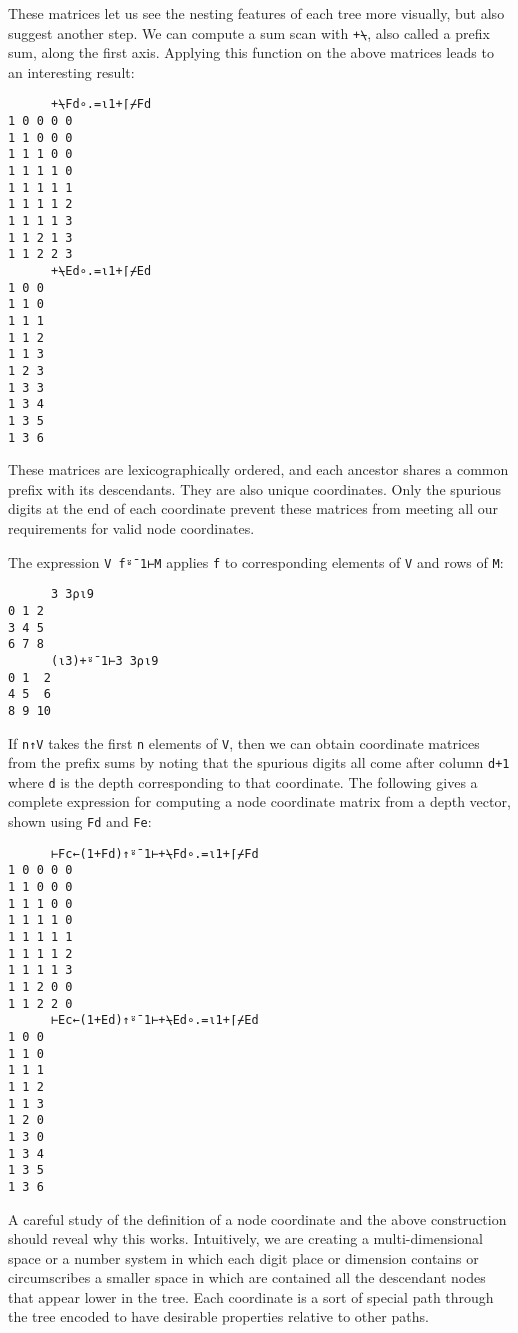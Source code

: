 \documentclass[numbers,9pt]{sigplanconf}
\begin{document}
\noindent
These matrices let us see the nesting features of each tree more
visually, but also suggest another step. We can compute a sum scan
with \verb;+⍀;, also called a prefix sum, along the first axis. Applying
this function on the above matrices leads to an interesting result:

\begin{verbatim}
      +⍀Fd∘.=⍳1+⌈⌿Fd
1 0 0 0 0
1 1 0 0 0
1 1 1 0 0
1 1 1 1 0
1 1 1 1 1
1 1 1 1 2
1 1 1 1 3
1 1 2 1 3
1 1 2 2 3
      +⍀Ed∘.=⍳1+⌈⌿Ed
1 0 0
1 1 0
1 1 1
1 1 2
1 1 3
1 2 3
1 3 3
1 3 4
1 3 5
1 3 6
\end{verbatim}

\noindent
These matrices are lexicographically ordered, and each ancestor
shares a common prefix with its descendants. They are also unique
coordinates. Only the spurious digits at the end of each coordinate
prevent these matrices from meeting all our requirements for valid
node coordinates.

The expression \verb;V f⍤¯1⊢M; applies \verb;f; to corresponding elements of
\verb;V; and rows of \verb;M;:

\begin{verbatim}
      3 3⍴⍳9
0 1 2
3 4 5
6 7 8
      (⍳3)+⍤¯1⊢3 3⍴⍳9
0 1  2
4 5  6
8 9 10
\end{verbatim}

\noindent
If \verb;n↑V; takes the first \verb;n; elements of \verb;V;, then we can obtain coordinate
matrices from the prefix sums by noting that the spurious digits
all come after column \verb;d+1; where \verb;d; is the depth corresponding to that
coordinate. The following gives a complete expression for computing
a node coordinate matrix from a depth vector, shown using \verb;Fd; and \verb;Fe;:

\begin{verbatim}
      ⊢Fc←(1+Fd)↑⍤¯1⊢+⍀Fd∘.=⍳1+⌈⌿Fd
1 0 0 0 0
1 1 0 0 0
1 1 1 0 0
1 1 1 1 0
1 1 1 1 1
1 1 1 1 2
1 1 1 1 3
1 1 2 0 0
1 1 2 2 0
      ⊢Ec←(1+Ed)↑⍤¯1⊢+⍀Ed∘.=⍳1+⌈⌿Ed
1 0 0
1 1 0
1 1 1
1 1 2
1 1 3
1 2 0
1 3 0
1 3 4
1 3 5
1 3 6
\end{verbatim}

A careful study of the definition of a node coordinate and the
above construction should reveal why this works. Intuitively, we are
creating a multi-dimensional space or a number system in which each
digit place or dimension contains or circumscribes a smaller space
in which are contained all the descendant nodes that appear lower in
the tree. Each coordinate is a sort of special path through the tree
encoded to have desirable properties relative to other paths.
\end{document}
